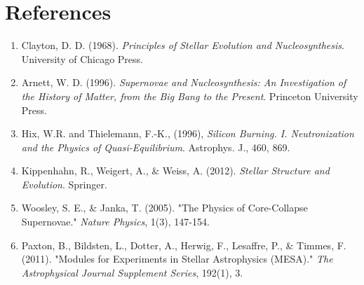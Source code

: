 \section{References}
\begin{enumerate}
    \item Clayton, D. D. (1968). \textit{Principles of Stellar Evolution and Nucleosynthesis}. University of Chicago Press.
    \item Arnett, W. D. (1996). \textit{Supernovae and Nucleosynthesis: An Investigation of the History of Matter, from the Big Bang to the Present}. Princeton University Press.
    \item Hix, W.R. and Thielemann, F.-K., (1996), \textit{Silicon Burning. I. Neutronization and the Physics of Quasi-Equilibrium}. Astrophys. J., 460, 869.
    \item Kippenhahn, R., Weigert, A., \& Weiss, A. (2012). \textit{Stellar Structure and Evolution}. Springer.
    \item Woosley, S. E., \& Janka, T. (2005). "The Physics of Core-Collapse Supernovae." \textit{Nature Physics}, 1(3), 147-154.
    \item Paxton, B., Bildsten, L., Dotter, A., Herwig, F., Lesaffre, P., \& Timmes, F. (2011). "Modules for Experiments in Stellar Astrophysics (MESA)." \textit{The Astrophysical Journal Supplement Series}, 192(1), 3.
\end{enumerate}